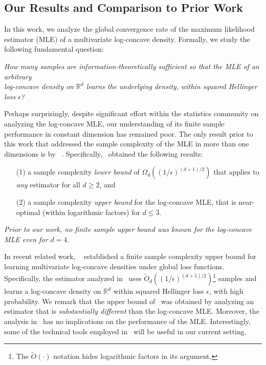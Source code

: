 \documentclass[final,12pt]{colt2018}
\newtheorem{informal theorem}[theorem]{Theorem (informal statement)}
\newcommand{\R}{\mathbb{R}}
\newcommand{\eps}{\epsilon}
\begin{document}
\subsection{Our Results and Comparison to Prior Work}
In this work, we analyze the global convergence rate of the maximum likelihood estimator (MLE)
of a multivariate log-concave density. Formally, we study the following fundamental question: 
\begin{center}
{\em How many samples are information-theoretically sufficient
so that the MLE of an arbitrary \\ log-concave density on $\R^d$ learns the underlying density, within squared Hellinger loss $\eps$?}
\end{center}
Perhaps surprisingly, despite significant effort within the statistics community 
on analyzing the log-concave MLE, our understanding of its finite sample performance 
in constant dimension has remained poor. 
The only result prior to this work that addressed the sample complexity 
of the MLE in more than one dimensions is by %
~\cite{KimSam16}.
Specifically,~\cite{KimSam16} obtained the following results: 
\begin{itemize}
\item[(1)] a sample complexity {\em lower bound} of
$\Omega_d \left( (1/\eps)^{(d+1)/2} \right)$ that applies to {\em any} estimator 
for all $d \geq 2$, and 
\item[(2)] a sample complexity {\em upper bound} for the log-concave MLE, that is near-optimal (within logarithmic factors) 
for $d \leq 3$. 
\end{itemize}
{\em Prior to our work, no finite sample upper bound was known for the log-concave 
MLE even for $d=4$.}

In recent related work, %
~\cite{DiakonikolasKS17-lc} 
established a finite sample complexity upper bound for learning multivariate 
log-concave densities under global loss functions. 
Specifically, the estimator analyzed in~\cite{DiakonikolasKS17-lc} 
uses $\tilde{O}_d \left( (1/\eps)^{(d+5)/2} \right)$\footnote{The $\tilde{O}(\cdot)$ notation hides 
logarithmic factors in its argument.} samples
and learns a log-concave density on $\R^d$ within squared Hellinger loss 
$\eps$, with high probability. 
We remark that the upper bound of~\cite{DiakonikolasKS17-lc}
was obtained by analyzing an estimator that is {\em substantially different} than the log-concave MLE. 
Moreover, the analysis in~\cite{DiakonikolasKS17-lc} has no implications on the performance of the MLE. 
Interestingly, some of the technical tools employed in~\cite{DiakonikolasKS17-lc} 
will be useful in our current setting.
\end{document}
